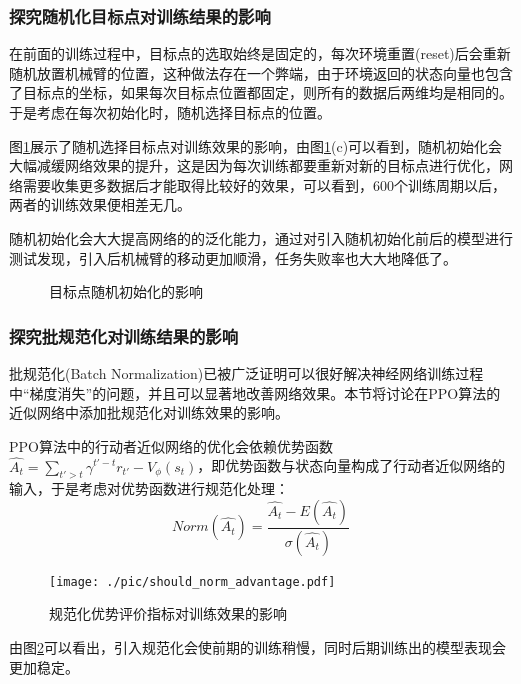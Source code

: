 \documentclass[bachelor]{thesis-uestc}
\begin{document}
	\subsubsection{探究随机化目标点对训练结果的影响}
	在前面的训练过程中，目标点的选取始终是固定的，每次环境重置(reset)后会重新随机放置机械臂的位置，这种做法存在一个弊端，由于环境返回的状态向量也包含了目标点的坐标，如果每次目标点位置都固定，则所有的数据后两维均是相同的。于是考虑在每次初始化时，随机选择目标点的位置。
	
	图\ref{fixed-point}展示了随机选择目标点对训练效果的影响，由图\ref{fixed-point}(c)可以看到，随机初始化会大幅减缓网络效果的提升，这是因为每次训练都要重新对新的目标点进行优化，网络需要收集更多数据后才能取得比较好的效果，可以看到，600个训练周期以后，两者的训练效果便相差无几。
	
	随机初始化会大大提高网络的的泛化能力，通过对引入随机初始化前后的模型进行测试发现，引入后机械臂的移动更加顺滑，任务失败率也大大地降低了。
	\begin{figure}[h]
		\centering
		\caption{目标点随机初始化的影响}
		\label{fixed-point}
	\end{figure}
	\subsubsection{探究批规范化对训练结果的影响}
	批规范化(Batch Normalization)\cite{Ioffe2015Batch}已被广泛证明可以很好解决神经网络训练过程中“梯度消失”的问题，并且可以显著地改善网络效果。本节将讨论在PPO算法的近似网络中添加批规范化对训练效果的影响。
	
	PPO算法中的行动者近似网络的优化会依赖优势函数$\hat{A_t}=\sum_{t'>t}\gamma^{t'-t}r_{t'}-V_\phi(s_t)$，即优势函数与状态向量构成了行动者近似网络的输入，于是考虑对优势函数进行规范化处理：
	\begin{equation}
		\label{eq30}
		Norm(\hat{A_t})=\frac{\hat{A_t}-E(\hat{A_t})}{\sigma(\hat{A_t})}
	\end{equation}
	\begin{figure}[h]
		\texttt{[image: ./pic/should\_norm\_advantage.pdf]}
		\caption{规范化优势评价指标对训练效果的影响}
		\label{norm}
	\end{figure}
	由图\ref{norm}可以看出，引入规范化会使前期的训练稍慢，同时后期训练出的模型表现会更加稳定。
\end{document}
